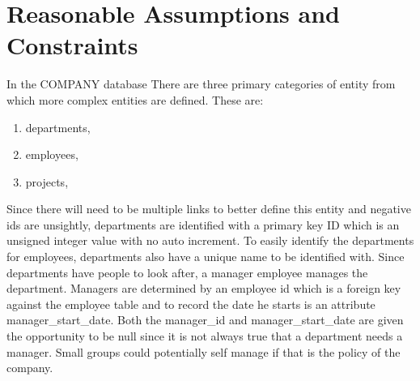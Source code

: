 \documentclass[11pt,letterpaper]{article}
\begin{document}
\begin{center}
	\end{center}
	
		
	
	\pagebreak

	\section{Reasonable Assumptions and Constraints}
	
In the COMPANY database There are three primary categories of entity from which more complex entities are defined. These are:
\begin{enumerate}[]
	\item departments, 
	\item employees,
	\item projects,
\end{enumerate}

Since there will need to be multiple links to better define this entity and negative ids are unsightly, departments are identified with a primary key ID which is an unsigned integer value with no auto increment. To easily identify the departments for employees, departments also have a unique name to be identified with. Since departments have people to look after, a manager employee manages the department. Managers are determined by an employee id which is a foreign key against the employee table and to record the date he starts is an attribute manager\_start\_date.
Both the manager\_id and manager\_start\_date are given the opportunity to be null since it is not always true that a department needs a manager. Small groups could potentially self manage if that is the policy of the company.\\
\end{document}
